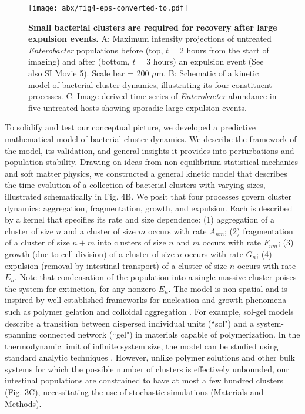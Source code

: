 \begin{figure*}[h]
\centerline{
	\texttt{[image: abx/fig4-eps-converted-to.pdf]}}
	\caption{\textbf{Small bacterial clusters are required for recovery after large expulsion events.}  A: Maximum intensity projections of untreated \textit{Enterobacter} populations before (top, $t=2$ hours from the start of imaging) and after (bottom, $t=3$ hours) an expulsion event (See also SI Movie 5). Scale bar = 200 $\mu$m. B: Schematic of a kinetic model of bacterial cluster dynamics, illustrating its four constituent processes. C: Image-derived time-series of \textit{Enterobacter} abundance in five untreated hosts showing sporadic large expulsion events.}
\end{figure*}

To solidify and test our conceptual picture, we developed a predictive mathematical model of bacterial cluster dynamics. We describe the framework of the model, its validation, and general insights it provides into perturbations and population stability. Drawing on ideas from non-equilibrium statistical mechanics and soft matter physics, we constructed a general kinetic model that describes the time evolution of a collection of bacterial clusters with varying sizes, illustrated schematically in Fig. 4B. We posit that four processes govern cluster dynamics: aggregation, fragmentation, growth, and expulsion.  Each is described by a kernel that specifies its rate and size dependence: (1) aggregation of a cluster of size $n$ and a cluster of size $m$ occurs with rate $A_{nm}$; (2) fragmentation of a cluster of size $n+m$ into clusters of size $n$ and $m$ occurs with rate $F_{nm}$; (3) growth (due to cell division) of a cluster of size $n$ occurs with rate $G_n$; (4) expulsion (removal by intestinal transport) of a cluster of size $n$ occurs with rate $E_n$. Note that condensation of the population into a single massive cluster poises the system for extinction, for any nonzero $E_n$. The model is non-spatial and is inspired by well established frameworks for nucleation and growth phenomena such as polymer gelation and colloidal aggregation \cite{krapivsky2010kinetic}. For example, sol-gel models describe a transition between dispersed individual units (``sol") and a system-spanning connected network (``gel") in materials capable of polymerization. In the thermodynamic limit of infinite system size, the model  can be studied using standard analytic techniques \cite{krapivsky2010kinetic}. However, unlike polymer solutions and other bulk systems for which the possible number of clusters is effectively unbounded, our intestinal populations are constrained to have at most a few hundred clusters (Fig. 3C), necessitating the use of stochastic simulations (Materials and Methods).

